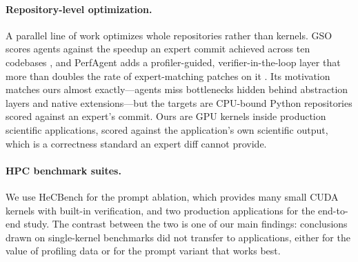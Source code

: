 \paragraph{Repository-level optimization.}
A parallel line of work optimizes whole repositories rather than kernels. GSO scores agents against the
speedup an expert commit achieved across ten codebases \cite{shetty2025gso}, and PerfAgent adds a
profiler-guided, verifier-in-the-loop layer that more than doubles the rate of expert-matching patches
on it \cite{deng2026perfagent}. Its motivation matches ours almost exactly---agents miss bottlenecks
hidden behind abstraction layers and native extensions---but the targets are CPU-bound Python
repositories scored against an expert's commit. Ours are GPU kernels inside production scientific
applications, scored against the application's own scientific output, which is a correctness standard
an expert diff cannot provide.

\paragraph{HPC benchmark suites.}
We use HeCBench \cite{jin2023hecbench} for the prompt ablation, which provides many small CUDA kernels
with built-in verification, and two production applications for the end-to-end study. The contrast
between the two is one of our main findings: conclusions drawn on single-kernel benchmarks did not
transfer to applications, either for the value of profiling data or for the prompt variant that works
best.
